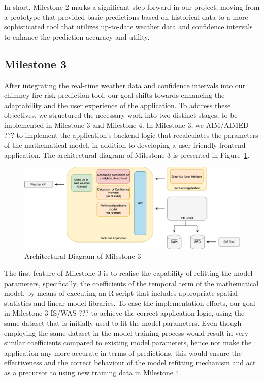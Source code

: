 \documentclass{utitcphd_overleaf}
\begin{document}
In short, Milestone 2 marks a significant step forward in our project, moving from a prototype that provided basic predictions based on historical data to a more sophisticated tool that utilizes up-to-date weather data and confidence intervals to enhance the prediction accuracy and utility.

\subsection{Milestone 3}

After integrating the real-time weather data and confidence intervals into our chimney fire risk prediction tool, our goal shifts towards enhancing the adaptability and the user experience of the application. To address these objectives, we structured the necessary work into two distinct stages, to be implemented in Milestone 3 and Milestone 4. In Milestone 3, we AIM/AIMED ??? to implement the application's backend logic that recalculates the parameters of the mathematical model, in addition to developing a user-friendly frontend application. The architectural diagram of Milestone 3 is presented in Figure~\ref{fig:iteration_3_arch}.

\begin{figure}[ht]
  \centering
  \includegraphics[width=1\textwidth]{my_images/milestones/iteration_3_arch.pdf}
  \caption{Architectural Diagram of Milestone 3}
  \label{fig:iteration_3_arch}
\end{figure}

The first feature of Milestone 3 is to realise the capability of refitting the model parameters, specifically, the coefficients of the temporal term of the mathematical model, by means of executing an R script that includes appropriate spatial statistics and linear model libraries. To ease the implementation efforts, our goal in Milestone 3 IS/WAS ??? to achieve the correct application logic, using the same dataset that is initially used to fit the model parameters. Even though employing the same dataset in the model training process would result in very similar coefficients compared to existing model parameters, hence not make the application any more accurate in terms of predictions, this would ensure the effectiveness and the correct behaviour of the model refitting mechanism and act as a precursor to using new training data in Milestone 4.
\end{document}
